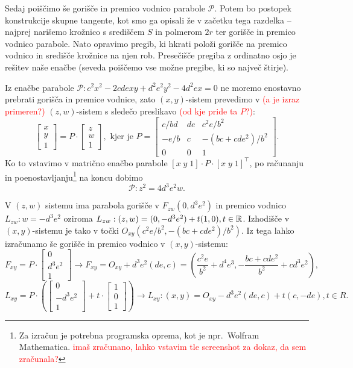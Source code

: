 Sedaj poiščimo še gorišče in premico vodnico parabole $\mathcal{P}$. Potem bo postopek konstrukcije skupne tangente, kot smo ga opisali že v začetku tega razdelka -- najprej narišemo krožnico s središčem $S$ in polmerom $2r$ ter gorišče in premico vodnico parabole. Nato opravimo pregib, ki hkrati položi gorišče na premico vodnico in središče krožnice na njen rob. Presečišče pregiba z ordinatno osjo je rešitev naše enačbe (seveda poiščemo vse možne pregibe, ki so največ štirje).

Iz enačbe parabole $\mathcal{P}: c^2x^2 - 2cdexy + d^2e^2y^2 - 4d^2ex = 0$ ne moremo enostavno prebrati gorišča in premice vodnice, zato $(x, y)$-sistem prevedimo v \textcolor{red}{(a je izraz primeren?)} $(z, w)$-sistem s sledečo preslikavo \textcolor{red}{(od kje pride ta $P$?)}:
$$ \begin{bmatrix} x\\y\\1\end{bmatrix} = P \cdot \begin{bmatrix} z\\w\\1\end{bmatrix}, \text{ kjer je } P =
\begin{bmatrix}
    c/bd & de & c^2e/b^2\\
    -e/b & c & -(bc + cde^2)/b^2\\
    0 & 0 & 1
\end{bmatrix}.
$$
Ko to vstavimo v matrično enačbo parabole $[x\;y\;1] \cdot P \cdot [x\;y\;1]^\intercal$, po računanju in poenostavljanju\footnote{Za izračun je potrebna programska oprema, kot je npr.\ Wolfram Mathematica. \textcolor{red}{imaš zračunano, lahko vstavim tle screenshot za dokaz, da sem zračunala?}} na koncu dobimo
$$ \mathcal{P}: z^2 = 4d^3e^2w. $$

V $(z, w)$ sistemu ima parabola gorišče v $F_{zw}(0, d^3e^2)$ in premico vodnico $L_{zw}: w = - d^3e^2$ oziroma $L_{zw}: (z, w) = (0, -d^3e^2) + t(1, 0), t \in \mathbb R $. Izhodišče v $(x, y)$-sistemu je tako v točki $O_{xy} (c^2e/b^2, -(bc + cde^2)/b^2)$. Iz tega lahko izračunamo še gorišče in premico vodnico v $(x, y)$-sistemu:
$$ F_{xy} = P \cdot \begin{bmatrix} 0\\d^3e^2\\1\end{bmatrix} \longrightarrow F_{xy} = O_{xy} + d^3e^2(de, c) = (\frac{c^2e}{b^2} + d^4e^3, -\frac{bc + cde^2}{b^2} + cd^3e^2),$$
$$ L_{xy} = P \cdot \left( \begin{bmatrix} 0\\-d^3e^2\\1\end{bmatrix} + t \cdot \begin{bmatrix} 1\\0\\1\end{bmatrix} \right) \longrightarrow L_{xy}: (x, y) = O_{xy} - d^3e^2(de, c) + t(c, -de), t \in R.$$

